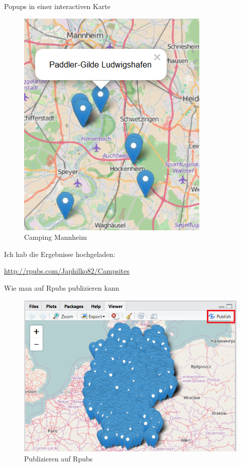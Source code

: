 \documentclass[ignorenonframetext,]{beamer}
\begin{document}
\begin{frame}{Popups in einer interactiven Karte}
\protect\hypertarget{popups-in-einer-interactiven-karte}{}

\begin{figure}
\centering
\includegraphics{figure/Camping_Mannheim.PNG}
\caption{Camping Mannheim}
\end{figure}

Ich hab die Ergebnisse hochgeladen:

\url{http://rpubs.com/Japhilko82/Campsites}

\end{frame}

\begin{frame}{Wie man auf Rpubs publizieren kann}
\protect\hypertarget{wie-man-auf-rpubs-publizieren-kann}{}

\begin{figure}
\centering
\includegraphics{figure/PublishCampSitesGermany.PNG}
\caption{Publizieren auf Rpubs}
\end{figure}

\end{frame}
\end{document}
